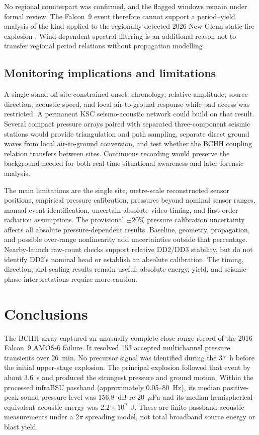 \documentclass[]{seismica}
\begin{document}
No regional counterpart was confirmed, and the flagged windows remain under
formal review. The Falcon~9 event therefore cannot support a period--yield
analysis of the kind applied to the regionally detected 2026 New Glenn
static-fire explosion \citep{silber_scamfer_newglenn_2026}. Wind-dependent
spectral filtering is an additional reason not to transfer regional period
relations without propagation modelling \citep{silber_wind_filtering_2026}.

\subsection{Monitoring implications and limitations}

A single stand-off site constrained onset, chronology, relative amplitude,
source direction, acoustic speed, and local air-to-ground response while pad
access was restricted. A permanent KSC seismo-acoustic network could build on
that result. Several compact pressure arrays paired with separated
three-component seismic stations would provide triangulation and path sampling,
separate direct ground waves from local air-to-ground conversion, and test
whether the BCHH coupling relation transfers between sites. Continuous
recording would preserve the background needed for both real-time situational
awareness and later forensic analysis.

The main limitations are the single site, metre-scale reconstructed sensor
positions, empirical pressure calibration, pressures beyond nominal sensor
ranges, manual event identification, uncertain absolute video timing, and
first-order radiation assumptions. The provisional $\pm20\%$ pressure
calibration uncertainty affects all absolute pressure-dependent results.
Baseline, geometry, propagation, and possible over-range nonlinearity add
uncertainties outside that percentage. Nearby-launch raw-count checks support
relative DD2/DD3 stability, but do not identify DD2's nominal head or establish
an absolute calibration. The timing, direction, and scaling results remain
useful; absolute energy, yield, and seismic-phase interpretations require more
caution.

\section{Conclusions}
\label{sec:conclusions}

The BCHH array captured an unusually complete close-range record of the 2016
Falcon~9 AMOS-6 failure. It resolved 153 accepted multichannel pressure
transients over 26~min. No precursor signal was identified during the 37~h
before the initial upper-stage explosion. The principal explosion followed that
event by about 3.6~s and produced the strongest pressure and ground motion.
Within the processed infraBSU passband (approximately 0.05--80~Hz), its median
positive-peak sound pressure level was 156.8~dB re 20~$\mu$Pa and its median
hemispherical-equivalent acoustic energy was $2.2\times10^9$~J. These are
finite-passband acoustic measurements under a $2\pi$ spreading model, not
total broadband source energy or blast yield.
\end{document}
